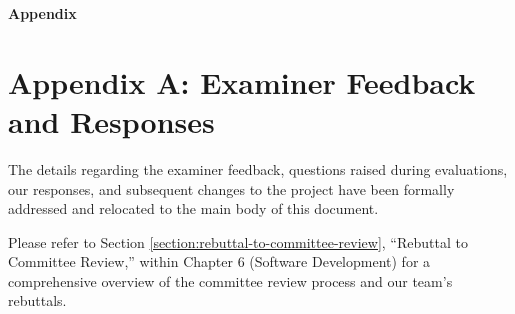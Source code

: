 \begin{center}
    \vspace*{2cm}
    \huge\textbf{Appendix}
    \vspace*{2cm}
\end{center}

\chapter*{Appendix A: Examiner Feedback and Responses}

The details regarding the examiner feedback, questions raised during evaluations, our responses, and subsequent changes to the project have been formally addressed and relocated to the main body of this document.

Please refer to Section \ref{section:rebuttal-to-committee-review}, ``Rebuttal to Committee Review,'' within Chapter 6 (Software Development) for a comprehensive overview of the committee review process and our team's rebuttals.